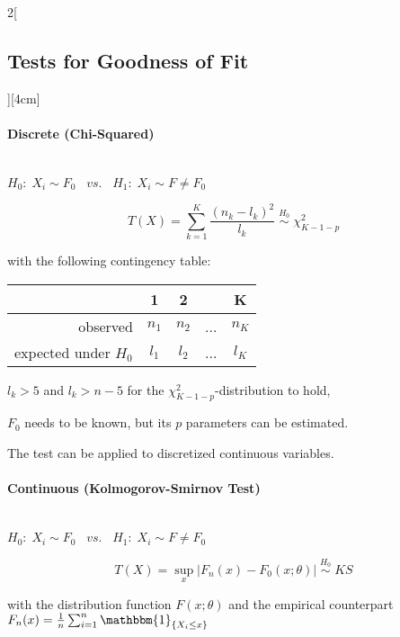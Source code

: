 \documentclass[8pt]{extarticle}
\begin{document}
\begin{multicols}{2}[\subsection{Tests for Goodness of Fit}][4cm]

\paragraph{Discrete (Chi-Squared)} \ \\
  
  \noindent $H_0\!:\; X_i \sim F_0 \;\;\; vs. \;\;\; H_1\!:\; X_i \sim F \neq F_0$
  
  $$T(X) = \sum_{k=1}^K \frac{(n_k - l_k)^2}{l_k} \; \overset{H_0}{\sim}\; \chi^2_{K-1-p}$$
  
  with the following contingency table:
  
  \begin{center}
  \begin{tabular}{r|cccc}
  & 1 & 2 & & K\\
  \hline
  observed & $n_1$ & $n_2$ & ... & $n_K$\\
  expected under $H_0$ & $l_1$ & $l_2$ & ... & $l_K$\\
  \end{tabular}
  \end{center}

\noindent $l_k>5$ and $l_k>n-5$ for the $\chi^2_{K-1-p}$-distribution to hold, 

\noindent $F_0$ needs to be known, but its $p$ parameters can be estimated.

\noindent The test can be applied to discretized continuous variables. 

\paragraph{Continuous (Kolmogorov-Smirnov Test)} \ \\
  
  \noindent $H_0\!:\; X_i \sim F_0 \;\;\; vs. \;\;\; H_1\!:\; X_i \sim F \neq F_0$
  
  $$T(X) = \sup_x |F_n(x) - F_0(x;\theta)| \; \overset{H_0}{\sim}\; KS$$

\noindent with the distribution function $F(x;\theta)$ and the empirical counterpart $F_n(x) = \frac{1}{n}\sum_{i=1}^n \mathbbm{1}_{\{X_i\leq x\}}$



\end{multicols}
\end{document}
